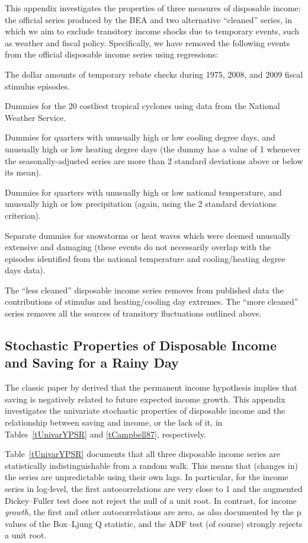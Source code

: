 \documentclass[titlepage]{\econtex}
\begin{document}
This appendix investigates the properties of three measures of disposable income: the official series produced by the BEA and two alternative ``cleaned'' series, in which we aim to exclude transitory income shocks due to temporary events, such as weather and fiscal policy. Specifically, we have removed the following events from the official disposable income series using regressions:
\bi
\item The dollar amounts of temporary rebate checks during 1975, 2008, and 2009 fiscal stimulus episodes.
\item Dummies for the 20 costliest tropical cyclones using data from the National Weather Service.
\item Dummies for quarters with unusually high or low cooling degree days, and unusually high or low heating degree days (the dummy has a value of 1 whenever the seasonally-adjusted series are more than 2 standard deviations above or below its mean).
\item Dummies for quarters with unusually high or low national temperature, and unusually high or low precipitation (again, using the 2 standard deviations criterion).
\item Separate dummies for snowstorms or heat waves which were deemed unusually extensive and damaging (these events do not necessarily overlap with the episodes identified from the national temperature and cooling/heating degree days data).
\ei

The ``less cleaned'' disposable income series removes from published data the contributions of stimulus and heating/cooling day extremes. The ``more cleaned'' series removes all the sources of transitory fluctuations outlined above.



\subsection{Stochastic Properties of Disposable Income and Saving for a Rainy Day}

The classic paper by \cite{cam87} derived that the permanent income hypothesis implies that saving is negatively  related to future expected income growth.  This appendix investigates the univariate stochastic properties of disposable income and the relationship between saving and income, or the lack of it, in Tables~\ref{tUnivarYPSR} and \ref{tCampbell87}, respectively.

Table~\ref{tUnivarYPSR} documents that all three disposable income series are statistically indistinguishable from a random walk. This means that (changes in) the series are unpredictable using their own lags. In particular, for the income series in log-level, the first autocorrelations are very close to 1 and the augmented Dickey--Fuller test does not reject the null of a unit root. In contrast, for income \emph{growth}, the first and other autocorrelations are zero, as also documented by the p values of the Box--Ljung Q statistic, and the ADF test (of course) strongly rejects  a unit root.
\end{document}
